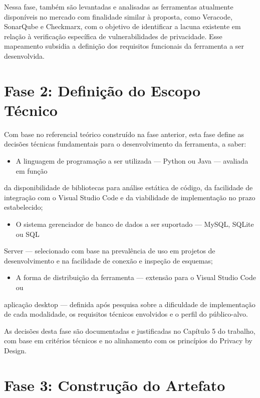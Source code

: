 \documentclass[oneside]{normas-utf-tex}
\begin{document}
Nessa fase, também são levantadas e analisadas as ferramentas atualmente disponíveis no mercado com finalidade similar à proposta, como Veracode, SonarQube e Checkmarx, com o objetivo de identificar a lacuna existente em relação à verificação específica de vulnerabilidades de privacidade. Esse mapeamento subsidia a definição dos requisitos funcionais da ferramenta a ser desenvolvida.

\section{Fase 2: Definição do Escopo Técnico}

Com base no referencial teórico construído na fase anterior, esta fase define as decisões técnicas fundamentais para o desenvolvimento da ferramenta, a saber:

\begin{itemize}
\item A linguagem de programação a ser utilizada — Python ou Java — avaliada em função
\end{itemize}

da disponibilidade de bibliotecas para análise estática de código, da facilidade de integração com o Visual Studio Code e da viabilidade de implementação no prazo estabelecido;

\begin{itemize}
\item O sistema gerenciador de banco de dados a ser suportado — MySQL, SQLite ou SQL
\end{itemize}

Server — selecionado com base na prevalência de uso em projetos de desenvolvimento e na facilidade de conexão e inspeção de esquemas;

\begin{itemize}
\item A forma de distribuição da ferramenta — extensão para o Visual Studio Code ou
\end{itemize}

aplicação desktop — definida após pesquisa sobre a dificuldade de implementação de cada modalidade, os requisitos técnicos envolvidos e o perfil do público-alvo.

As decisões desta fase são documentadas e justificadas no Capítulo 5 do trabalho, com base em critérios técnicos e no alinhamento com os princípios do Privacy by Design.

\section{Fase 3: Construção do Artefato}
\end{document}
